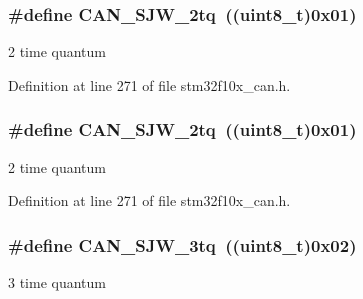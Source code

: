 \subsubsection[{\texorpdfstring{C\+A\+N\+\_\+\+S\+J\+W\+\_\+2tq}{CAN_SJW_2tq}}]{\setlength{\rightskip}{0pt plus 5cm}\#define C\+A\+N\+\_\+\+S\+J\+W\+\_\+2tq~(({\bf uint8\+\_\+t})0x01)}\hypertarget{group___c_a_n__synchronisation__jump__width_gad39e7656c555cc00bc4d7c1bff39916f}{}\label{group___c_a_n__synchronisation__jump__width_gad39e7656c555cc00bc4d7c1bff39916f}
2 time quantum 

Definition at line 271 of file stm32f10x\+\_\+can.\+h.

\subsubsection[{\texorpdfstring{C\+A\+N\+\_\+\+S\+J\+W\+\_\+2tq}{CAN_SJW_2tq}}]{\setlength{\rightskip}{0pt plus 5cm}\#define C\+A\+N\+\_\+\+S\+J\+W\+\_\+2tq~(({\bf uint8\+\_\+t})0x01)}\hypertarget{group___c_a_n__synchronisation__jump__width_gad39e7656c555cc00bc4d7c1bff39916f}{}\label{group___c_a_n__synchronisation__jump__width_gad39e7656c555cc00bc4d7c1bff39916f}
2 time quantum 

Definition at line 271 of file stm32f10x\+\_\+can.\+h.

\subsubsection[{\texorpdfstring{C\+A\+N\+\_\+\+S\+J\+W\+\_\+3tq}{CAN_SJW_3tq}}]{\setlength{\rightskip}{0pt plus 5cm}\#define C\+A\+N\+\_\+\+S\+J\+W\+\_\+3tq~(({\bf uint8\+\_\+t})0x02)}\hypertarget{group___c_a_n__synchronisation__jump__width_gab4de740e2184aac71c2c8cba22a8ecd2}{}\label{group___c_a_n__synchronisation__jump__width_gab4de740e2184aac71c2c8cba22a8ecd2}
3 time quantum 

